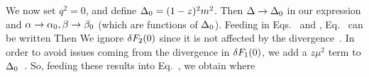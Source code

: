 \documentclass[11pt]{article}
\begin{document}
{	We now set $q^2 = 0$, and define $\Delta_0 = (1 - z)^2 m^2$.  Then $\Delta \to \Delta_0$ in our expression and $\alpha \to \alpha_0, \beta \to \beta_0$ (which are functions of $\Delta_0$).  Feeding in Eqs.~ and , Eq.~ can be written
	Then
	We ignore $\delta F_2(0)$ since it is not affected by the divergence~\cite[p.~196]{Peskin}.  In order to avoid issues coming from the divergence in $\delta F_1(0)$, we add a $z \mu^2$ term to $\Delta_0$~\cite[p.~195]{Peskin}.  So, feeding these results into Eq.~, we obtain
	where 
	
}
\end{document}

